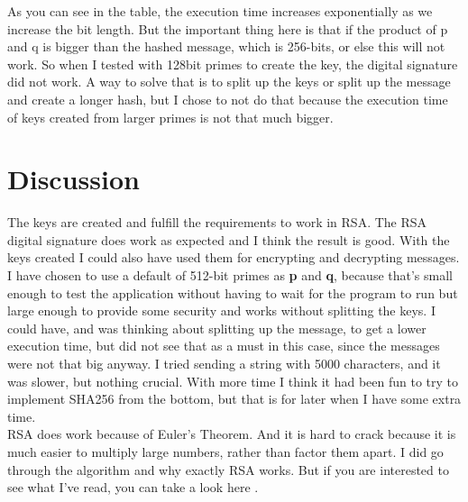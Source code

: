 \documentclass[12pt, letterpaper]{article}
\begin{document}
As you can see in the table, the execution time increases exponentially as we increase the bit length. But the important thing here is that if the product of p and q is bigger than the hashed message, which is 256-bits, or else this will not work. So when I tested with 128bit primes to create the key, the digital signature did not work. A way to solve that is to split up the keys or split up the message and create a longer hash, but I chose to not do that because the execution time of keys created from larger primes is not that much bigger.

\section*{Discussion}
The keys are created and fulfill the requirements to work in RSA. The RSA digital signature does work as expected and I think the result is good. With the keys created I could also have used them for encrypting and decrypting messages. I have chosen to use a default of 512-bit primes as \textbf{p} and \textbf{q}, because that's small enough to test the application without having to wait for the program to run but large enough to provide some security and works without splitting the keys. 
I could have, and was thinking about splitting up the message, to get a lower execution time, but did not see that as a must in this case, since the messages were not that big anyway. I tried sending a string with 5000 characters, and it was slower, but nothing crucial. With more time I think it had been fun to try to implement SHA256 from the bottom, but that is for later when I have some extra time. 
\\
RSA does work because of Euler's Theorem. And it is hard to crack because it is much easier to multiply large numbers, rather than factor them apart. I did go through the algorithm and why exactly RSA works. But if you are interested to see what I've read, you can take a look here \cite{RSA}.
\end{document}
